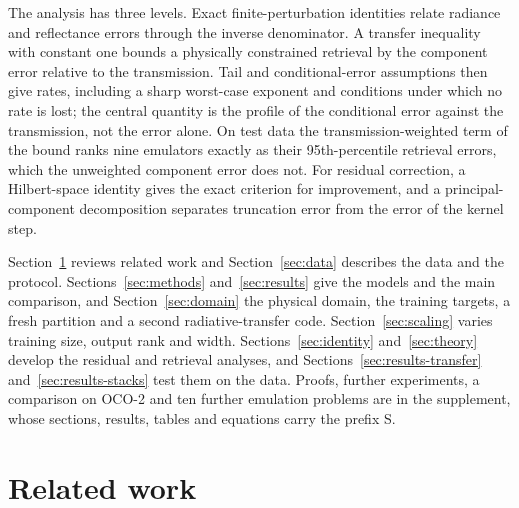 \documentclass[11pt]{article}
\newcommand{\1}{\mathbf{1}}
\begin{document}
The analysis has three levels. Exact finite-perturbation identities relate radiance and
reflectance errors through the inverse denominator. A transfer inequality with constant one
bounds a physically constrained retrieval by the component error relative to the
transmission. Tail and conditional-error assumptions then give rates, including a sharp
worst-case exponent and conditions under which no rate is lost; the central quantity is the
profile of the conditional error against the transmission, not the error alone. On test data the
transmission-weighted term of the bound ranks nine emulators exactly as their 95th-percentile
retrieval errors, which the unweighted component error does not. For residual
correction, a Hilbert-space identity gives the exact criterion for improvement, and a
principal-component decomposition separates truncation error from the error of the kernel
step.

Section~\ref{sec:related} reviews related work and Section~\ref{sec:data} describes the data
and the protocol. Sections~\ref{sec:methods} and~\ref{sec:results} give the models and the
main comparison, and Section~\ref{sec:domain} the physical domain, the training targets, a
fresh partition and a second radiative-transfer code. Section~\ref{sec:scaling} varies training
size, output rank and width. Sections~\ref{sec:identity} and~\ref{sec:theory} develop the residual and retrieval
analyses, and Sections~\ref{sec:results-transfer} and~\ref{sec:results-stacks} test them on the data.
Proofs, further experiments, a comparison on OCO-2 and ten further emulation problems are in the
supplement, whose sections, results, tables and equations carry the prefix S.

\section{Related work}\label{sec:related}
\end{document}
